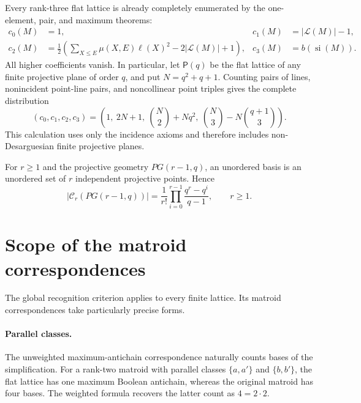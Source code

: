 \documentclass[11pt]{article}
\theoremstyle{definition}
\theoremstyle{remark}
\newcommand{\si}{\operatorname{si}}
\newcommand{\cL}{\mathcal L}
\newcommand{\cC}{\mathcal C}
\begin{document}
Every rank-three flat lattice is already completely enumerated by the
one-element, pair, and maximum theorems:
\begin{align*}
 c_0(M)&=1,& c_1(M)&=|\cL(M)|-1,\\
 c_2(M)&=\frac12\left(\sum_{X\le E}\mu(X,E)\ell(X)^2
              -2|\cL(M)|+1\right),&
 c_3(M)&=b(\si(M)).
\end{align*}
All higher coefficients vanish.  In particular, let $\mathsf P(q)$ be the
flat lattice of any finite projective plane of order $q$, and put
$N=q^2+q+1$.  Counting pairs of lines, nonincident point-line pairs, and
noncollinear point triples gives the complete distribution
\begin{equation}\label{eq:projective-plane-all}
 \boxed{
 (c_0,c_1,c_2,c_3)=
 \left(1,\ 2N+1,\ \binom N2+Nq^2,\
 \binom N3-N\binom{q+1}3\right).}
\end{equation}
This calculation uses only the incidence axioms and therefore includes
non-Desarguesian finite projective planes.

For $r\ge1$ and the projective geometry $PG(r-1,q)$, an unordered basis is an unordered
set of $r$ independent projective points.  Hence
\begin{equation}\label{eq:projective-count}
 |\cC_r(PG(r-1,q))|
 =\frac1{r!}\prod_{i=0}^{r-1}\frac{q^r-q^i}{q-1},
 \qquad r\ge1.
\end{equation}

\section{Scope of the matroid correspondences}

The global recognition criterion applies to every finite lattice.  Its matroid
correspondences take particularly precise forms.

\paragraph{Parallel classes.}
The unweighted maximum-antichain correspondence naturally counts bases of the
simplification.  For a rank-two matroid with parallel classes
$\{a,a'\}$ and $\{b,b'\}$, the flat lattice has one maximum Boolean
antichain, whereas the original matroid has four bases.  The weighted formula
recovers the latter count as $4=2\cdot2$.
\end{document}
